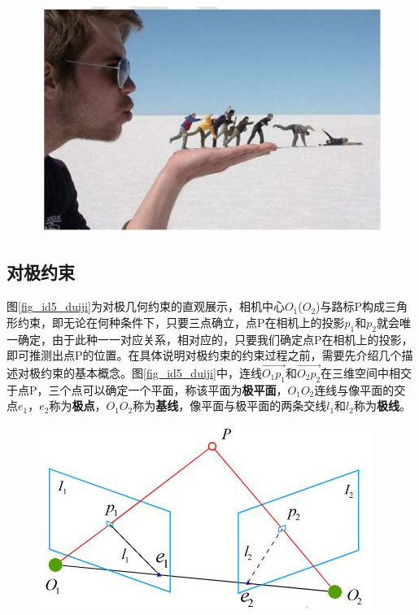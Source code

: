\documentclass[10.5pt,twocolumn]{jbuaa}
\begin{document}
\begin{figure}[h!]
	\centering
	\includegraphics [scale=0.4,trim=0 0 0 0]{./image/mono}
\end{figure}


\subsection{对极约束}
图\ref{fig_id5_duiji}为对极几何约束的直观展示，相机中心$ O_{1} $($ O_{2} $)与路标P构成三角形约束，即无论在何种条件下，只要三点确立，点P在相机上的投影$ p_{1} $和$ p_{2} $就会唯一确定，由于此种一一对应关系，相对应的，只要我们确定点P在相机上的投影，即可推测出点P的位置。在具体说明对极约束的约束过程之前，需要先介绍几个描述对极约束的基本概念。图\ref{fig_id5_duiji}中，连线$\overrightarrow{O_{1}p_{1}}$和$\overrightarrow{O_{2}p_{2}}$在三维空间中相交于点P，三个点可以确定一个平面，称该平面为\textbf{极平面}，$ O_{1}O_{2} $连线与像平面的交点$ e_{1} $，$ e_{2} $称为\textbf{极点}，$ O_{1}O_{2} $称为\textbf{基线}，像平面与极平面的两条交线$ l_{1} $和$ l_{2} $称为\textbf{极线}。


\begin{figure}[h!]
\centering
\includegraphics [scale=0.4,trim=0 0 0 0]{./image/duiji}
\end{figure}
\end{document}

